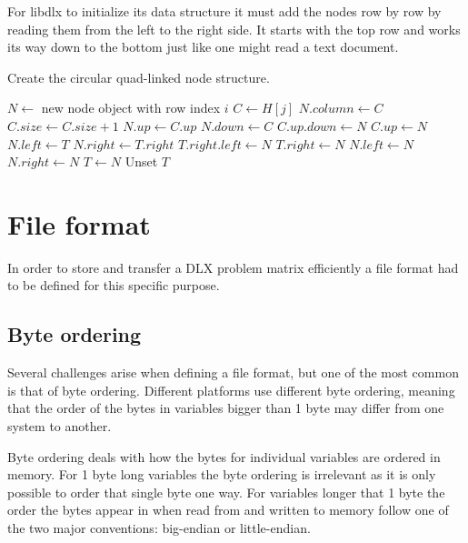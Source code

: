 For libdlx to initialize its data structure it must add the nodes row by row by reading them from the left to the right side.
It starts with the top row and works its way down to the bottom just like one might read a text document.

\begin{algorithm}[H]
	\caption{Create the circular quad-linked node structure.}
	\label{alg:nodes}
	\begin{distribalgo}[1]
				\STATE $N \leftarrow$ new node object with row index $i$
				\STATE $C \leftarrow H[j]$
				\STATE $N.column \leftarrow C$
				\STATE $C.size \leftarrow C.size + 1$
				\STATE $N.up \leftarrow C.up$
				\STATE $N.down \leftarrow C$
				\STATE $C.up.down \leftarrow N$
				\STATE $C.up \leftarrow N$
					\STATE $N.left \leftarrow T$
					\STATE $N.right \leftarrow T.right$
					\STATE $T.right.left \leftarrow N$
					\STATE $T.right \leftarrow N$
				\ELSE
					\STATE $N.left \leftarrow N$  
					\STATE $N.right \leftarrow N$
				\ENDIF
				\STATE $T \leftarrow N$
			\ENDFOR
			\STATE Unset $T$
		\ENDFOR
	\end{distribalgo}
\end{algorithm}






\section{File format}

In order to store and transfer a DLX problem matrix efficiently a file format had to be defined for this specific purpose.


\subsection{Byte ordering}

Several challenges arise when defining a file format, but one of the most common is that of byte ordering.
Different platforms use different byte ordering, meaning that the order of the bytes in variables bigger than 1 byte may differ from one system to another.

Byte ordering deals with how the bytes for individual variables are ordered in memory.
For 1 byte long variables the byte ordering is irrelevant as it is only possible to order that single byte one way.
For variables longer that 1 byte the order the bytes appear in when read from and written to memory follow one of the two major conventions: big-endian or little-endian.

